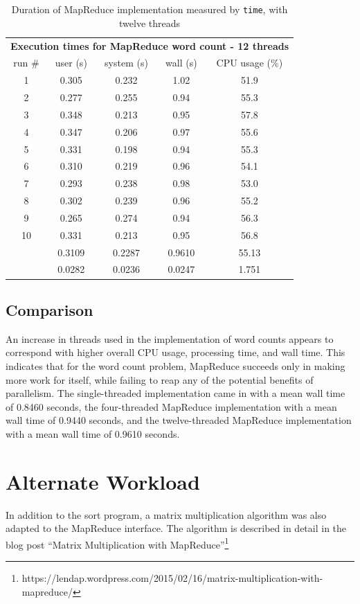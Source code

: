 \documentclass[12pt, letterpaper]{article}
\begin{document}
	\begin{table}[h]
	\centering
	\begin{tabular}{ccccc}
	\multicolumn{5}{c}{\cellcolor[HTML]{FFFFC7}\textbf{Execution times for MapReduce word count - 12 threads}} \\
	\rowcolor[HTML]{EFEFEF} 
	run \# & user (s) & system (s) & wall (s) & CPU usage (\%) \\
	1 & 0.305 & 0.232 & 1.02 & 51.9 \\
	2 & 0.277 & 0.255 & 0.94 & 55.3 \\
	3 & 0.348 & 0.213 & 0.95 & 57.8 \\
	4 & 0.347 & 0.206 & 0.97 & 55.6 \\
	5 & 0.331 & 0.198 & 0.94 & 55.3 \\
	6 & 0.310 & 0.219 & 0.96 & 54.1 \\
	7 & 0.293 & 0.238 & 0.98 & 53.0 \\
	8 & 0.302 & 0.239 & 0.96 & 55.2 \\
	9 & 0.265 & 0.274 & 0.94 & 56.3 \\
	10 & 0.331 & 0.213 & 0.95 & 56.8 \\
	\rowcolor[HTML]{D0F0D0} 
	\multicolumn{1}{r}{\cellcolor[HTML]{9AFF99}mean (s)} & 0.3109 & 0.2287 & 0.9610 & 55.13 \\
	\rowcolor[HTML]{ECF4FF} 
	\multicolumn{1}{r}{\cellcolor[HTML]{DAE8FC}std. dev. (s)} & 0.0282 & 0.0236 & 0.0247 & 1.751
	\end{tabular}
	\caption{Duration of MapReduce implementation measured by \texttt{time}, with twelve threads\label{table:MR12ImplWC}}
	\end{table}
\subsection{Comparison}
	An increase in threads used in the implementation of word counts appears to correspond with higher overall CPU usage, processing time, and wall time.
	This indicates that for the word count problem, MapReduce succeeds only in making more work for itself, while failing to reap any of the potential benefits of parallelism.
	The single-threaded implementation came in with a mean wall time of 0.8460 seconds, the four-threaded MapReduce implementation with a mean wall time of 0.9440 seconds, and the twelve-threaded MapReduce implementation with a mean wall time of 0.9610 seconds.
	
\section{Alternate Workload}
In addition to the sort program, a matrix multiplication algorithm was also adapted to the MapReduce interface. The algorithm is described in detail in the blog post “Matrix Multiplication with MapReduce”\footnote{https://lendap.wordpress.com/2015/02/16/matrix-multiplication-with-mapreduce/}
\end{document}
